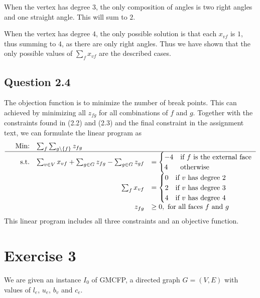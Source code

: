 \documentclass[a4paper]{article}
\begin{document}
When the vertex has degree $3$, the only composition of angles is two right angles and one straight angle. This will sum to $2$.

When the vertex has degree $4$, the only possible solution is that each $x_{vf}$ is $1$, thus summing to $4$, as there are only right angles.
Thus we have shown that the only possible values of \(\sum_{f} x_{vf}\) are the described cases.

\subsection*{Question 2.4}
The objection function is to minimize the number of break points. This can achieved by minimizing all $z_{fg}$ for all combinations of $f$ and $g$. Together with the constraints found in (2.2) and (2.3) and the final constraint in the assignment text, we can formulate the linear program as
\begin{equation}
\begin{array}{rrll}
&\text{Min:} & \sum_{f}\sum_{g\backslash\{f\}} z_{fg} &\\
\hline
&\text{s.t.} & \sum_{v\in V} x_{vf}+\sum_{g\in G} z_{fg}-\sum_{g\in G} z_{gf} &=
\begin{cases}
-4 & \text{if $f$ is the external face} \\
4  & \text{otherwise}
\end{cases} \\
& & \multicolumn{1}{r}{\sum_{f} x_{vf}} &=
\begin{cases}
0 & \text{if $v$ has degree 2} \\
2 & \text{if $v$ has degree 3} \\
4 & \text{if $v$ has degree 4}
\end{cases} \\
& &\multicolumn{1}{r}{z_{fg}} & \geq 0, \mbox{ for all faces $f$ and $g$}
\end{array}
\end{equation}
This linear program includes all three constraints and an objective function.

\section*{Exercise 3}
We are given an instance $I_0$ of GMCFP, a directed graph $G=(V,E)$ with values of $l_e$, $u_e$, $b_v$ and $c_e$.
\end{document}
